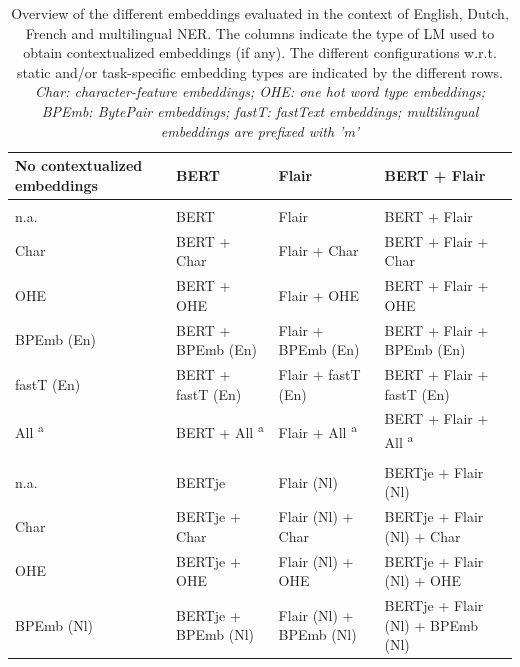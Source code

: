 \documentclass[12pt,a4paper,]{book}
\begin{document}
\begin{landscape}\begin{table}

\caption{\label{tab:embeddings}Overview of the different embeddings evaluated in the context of English, Dutch, French and multilingual NER. The columns indicate the type of LM used to obtain contextualized embeddings (if any). The different configurations w.r.t. static and/or task-specific embedding types are indicated by the different rows. \textit{Char: character-feature embeddings; OHE: one hot word type embeddings; BPEmb: BytePair embeddings; fastT: fastText embeddings; multilingual embeddings are prefixed with 'm'}}
\centering
\fontsize{9}{11}\selectfont
\begin{tabular}[t]{llll}
\toprule
No contextualized embeddings & BERT & Flair & BERT + Flair\\
\midrule
\addlinespace[0.3em]
\multicolumn{4}{l}{\textbf{English}}\\
\hspace{1em}n.a. & BERT & Flair & BERT + Flair\\
\hspace{1em}Char & BERT + Char & Flair + Char & BERT + Flair + Char\\
\hspace{1em}OHE & BERT + OHE & Flair + OHE & BERT + Flair + OHE\\
\hspace{1em}BPEmb (En) & BERT + BPEmb (En) & Flair + BPEmb (En) & BERT + Flair + BPEmb (En)\\
\hspace{1em}fastT (En) & BERT + fastT (En) & Flair + fastT (En) & BERT + Flair + fastT (En)\\
\hspace{1em}All \textsuperscript{a} & BERT + All \textsuperscript{a} & Flair + All \textsuperscript{a} & BERT + Flair + All \textsuperscript{a}\\
\addlinespace[0.3em]
\multicolumn{4}{l}{\textbf{Dutch}}\\
\hspace{1em}n.a. & BERTje & Flair (Nl) & BERTje + Flair (Nl)\\
\hspace{1em}Char & BERTje + Char & Flair (Nl) + Char & BERTje + Flair (Nl) + Char\\
\hspace{1em}OHE & BERTje + OHE & Flair (Nl) + OHE & BERTje + Flair (Nl) + OHE\\
\hspace{1em}BPEmb (Nl) & BERTje + BPEmb (Nl) & Flair (Nl) + BPEmb (Nl) & BERTje + Flair (Nl) + BPEmb (Nl)\\

\end{tabular}
\end{table}
\end{landscape}
\end{document}
